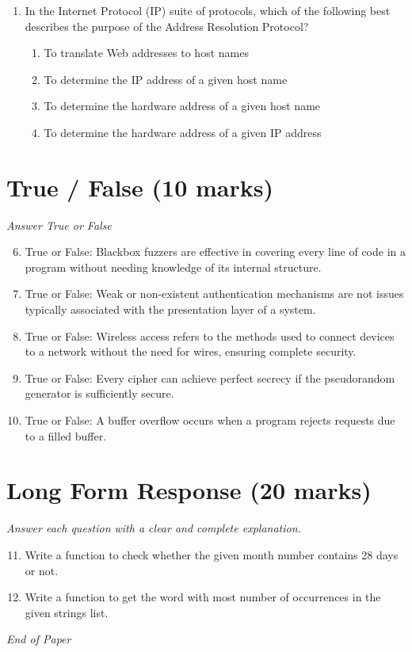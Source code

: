 \documentclass[12pt]{article}
\begin{document}
\begin{enumerate}[label=\arabic*.]
\begin{enumerate}[label=(\alph*)]
\end{enumerate}
\item In the Internet Protocol (IP) suite of protocols, which of the following best describes the purpose of the Address Resolution Protocol?
\begin{enumerate}[label=(\alph*)]
    \item To translate Web addresses to host names
    \item To determine the IP address of a given host name
    \item To determine the hardware address of a given host name
    \item To determine the hardware address of a given IP address
\end{enumerate}
\end{enumerate}

\section*{True / False (10 marks)}
\textit{Answer True or False}
\begin{enumerate}[label=\arabic*.]
\setcounter{enumi}{5}
\item True or False: Blackbox fuzzers are effective in covering every line of code in a program without needing knowledge of its internal structure.
\item True or False: Weak or non-existent authentication mechanisms are not issues typically associated with the presentation layer of a system.
\item True or False: Wireless access refers to the methods used to connect devices to a network without the need for wires, ensuring complete security.
\item True or False: Every cipher can achieve perfect secrecy if the pseudorandom generator is sufficiently secure.
\item True or False: A buffer overflow occurs when a program rejects requests due to a filled buffer.
\end{enumerate}

\section*{Long Form Response (20 marks)}
\textit{Answer each question with a clear and complete explanation.}
\begin{enumerate}[label=\arabic*.]
\setcounter{enumi}{10}
\item Write a function to check whether the given month number contains 28 days or not.
\item Write a function to get the word with most number of occurrences in the given strings list.
\end{enumerate}

\vfill
\noindent\textit{End of Paper}
\end{document}
